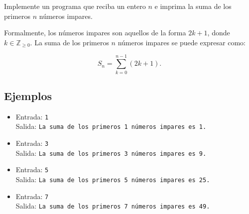 Implemente un programa que reciba un entero \(n\) e imprima la suma de los primeros \(n\) números impares.

Formalmente, los números impares son aquellos de la forma \(2k + 1\), donde \(k \in \mathbb{Z}_{\geq 0}\). La suma de los primeros \(n\) números impares se puede expresar como:

\[
S_n = \sum_{k=0}^{n-1} (2k + 1).
\]

\subsection*{Ejemplos}
\begin{itemize}
    \item Entrada: \texttt{1}\\
          Salida: \texttt{La suma de los primeros 1 números impares es 1.}
    \item Entrada: \texttt{3}\\
          Salida: \texttt{La suma de los primeros 3 números impares es 9.}
    \item Entrada: \texttt{5}\\
          Salida: \texttt{La suma de los primeros 5 números impares es 25.}
    \item Entrada: \texttt{7}\\
          Salida: \texttt{La suma de los primeros 7 números impares es 49.}
\end{itemize}
